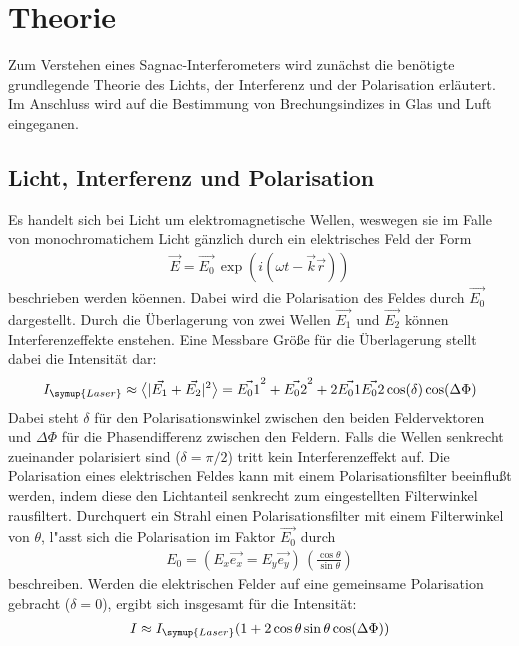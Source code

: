 \section{Theorie}
\label{sec:Theorie}

Zum Verstehen eines Sagnac-Interferometers wird zunächst die benötigte grundlegende Theorie des Lichts, der Interferenz und der Polarisation erl\"autert. Im Anschluss wird
auf die Bestimmung von Brechungsindizes in Glas und Luft eingeganen.

\subsection{Licht, Interferenz und Polarisation}

Es handelt sich bei Licht um elektromagnetische Wellen, weswegen sie im Falle von monochromatichem Licht g\"anzlich durch ein elektrisches Feld der Form
\begin{align}
    \vec{E} = \vec{E_0} \, \exp(i(\omega t - \vec{k}\vec{r}))
\end{align}
beschrieben werden k\"oennen. Dabei wird die Polarisation des Feldes durch $\vec{E_0}$ dargestellt.
Durch die \"Uberlagerung von zwei Wellen $\vec{E_1}$ und $\vec{E_2}$ k\"onnen Interferenzeffekte enstehen.
Eine Messbare Gr\"o\ss{}e f\"ur die \"Uberlagerung stellt dabei die Intensit\"at dar:
\begin{align}
    I_{\symup{Laser}} \approx \bigl< |\vec{E_1}+\vec{E_2}|^2 \bigr> = \vec{E_01}^2+\vec{E_02}^2 + 2\vec{E_01}\vec{E_02}\cos(\delta)\cos(\Delta \Phi)
\end{align}
Dabei steht $\delta$ f\"ur den Polarisationswinkel zwischen den beiden Feldervektoren und $\Delta \Phi$ f\"ur die Phasendifferenz zwischen den Feldern.
Falls die Wellen senkrecht zueinander polarisiert sind ($\delta=\pi/2$) tritt kein Interferenzeffekt auf.
Die Polarisation eines elektrischen Feldes kann mit einem Polarisationsfilter beeinflu\ss{}t werden, indem diese den Lichtanteil senkrecht zum eingestellten Filterwinkel rausfiltert.
Durchquert ein Strahl einen Polarisationsfilter mit einem Filterwinkel von $\theta$, l"asst sich die Polarisation im Faktor $\vec{E_0}$ durch
\begin{align}
    E_0 = (E_x\vec{e_x}=E_y\vec{e_y})\,\left(\frac{\cos\theta}{\sin\theta}\right)
\end{align}
beschreiben. Werden die elektrischen Felder auf eine gemeinsame Polarisation gebracht ($\delta=0$), ergibt sich insgesamt f\"ur die Intensit\"at:
\begin{align}
    I \approx I_{\symup{Laser}}(1+2\cos\theta\sin\theta\cos(\Delta\Phi))
\end{align}
